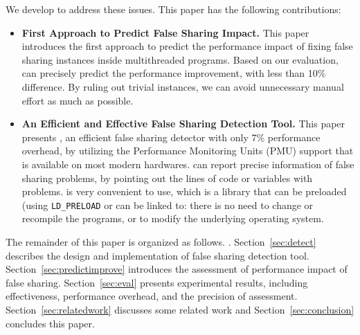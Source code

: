 \vspace{0.2in}


We develop \cheetah{} to address these issues. This paper has the following contributions:

\begin{itemize} 

\item {\bf First Approach to Predict False Sharing Impact.} This paper introduces the first approach to predict the performance impact of fixing false sharing instances inside multithreaded programs. Based on our evaluation, \cheetah{} can precisely predict the performance improvement, with less than 10\% difference. By ruling out trivial instances, we can avoid unnecessary manual effort as much as possible. 

\item {\bf An Efficient and Effective False Sharing Detection Tool.} This paper presents \cheetah{}, an efficient false sharing detector with only 7\% performance overhead, by utilizing the Performance Monitoring Units (PMU) support that is available on most modern hardwares. \cheetah{} can report precise information of false sharing problems, by pointing out the lines of code or variables with problems. \cheetah{} is very convenient to use, which is a library that can be preloaded (using \texttt{LD\_PRELOAD} or can be linked to: there is no need to change or recompile the programs, or to modify the underlying operating system.

\end{itemize}

The remainder of this paper is organized as follows. . Section~\ref{sec:detect} describes the design and implementation of false sharing detection tool. Section~\ref{sec:predictimprove} introduces the assessment of performance impact of false sharing. Section~\ref{sec:eval} presents experimental results, including effectiveness, performance overhead, and the precision of assessment. Section~\ref{sec:relatedwork} discusses some related work and Section~\ref{sec:conclusion} concludes this paper. 



